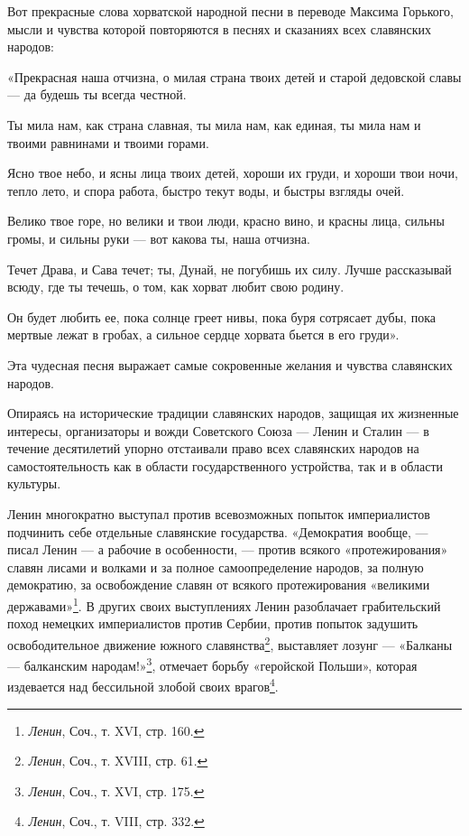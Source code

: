 \documentclass[12pt, a4paper, openany]{book}
\begin{document}
Вот прекрасные слова хорватской народной песни в переводе Максима Горького, мысли и чувства которой повторяются в песнях и сказаниях всех славянских народов:

«Прекрасная наша отчизна, о милая страна твоих детей и старой дедовской славы — да будешь ты всегда честной.

Ты мила нам, как страна славная, ты мила нам, как единая, ты мила нам и твоими равнинами и твоими горами.

Ясно твое небо, и ясны лица твоих детей, хороши их груди, и хороши твои ночи, тепло лето, и спора работа, быстро текут воды, и быстры взгляды очей.

Велико твое горе, но велики и твои люди, красно вино, и красны лица, сильны громы, и сильны руки — вот какова ты, наша отчизна.

Течет Драва, и Сава течет; ты, Дунай, не погубишь их силу. Лучше рассказывай всюду, где ты течешь, о том, как хорват любит свою родину.

Он будет любить ее, пока солнце греет нивы, пока буря сотрясает дубы, пока мертвые лежат в гробах, а сильное сердце хорвата бьется в его груди».

Эта чудесная песня выражает самые сокровенные желания и чувства славянских народов.

Опираясь на исторические традиции славянских народов, защищая их жизненные интересы, организаторы и вожди Советского Союза — Ленин и Сталин — в течение десятилетий упорно отстаивали право всех славянских народов на самостоятельность как в области государственного устройства, так и в области культуры.

Ленин многократно выступал против всевозможных попыток империалистов подчинить себе отдельные славянские государства. «Демократия вообще, — писал Ленин — а рабочие в особенности, — против всякого «протежирования» славян лисами и волками и за полное самоопределение народов, за полную демократию, за освобождение славян от всякого протежирования «великими державами»{\footnote{\textit{Ленин}, Соч., т. XVI, стр. 160.}}. В других своих выступлениях Ленин разоблачает грабительский поход немецких империалистов против Сербии, против попыток задушить освободительное движение южного славянства{\footnote{\textit{Ленин}, Соч., т. XVIII, стр. 61.}}, выставляет лозунг — «Балканы — балканским народам!»{\footnote{\textit{Ленин}, Соч., т. XVI, стр. 175.}}, отмечает борьбу «геройской Польши», которая издевается над бессильной злобой своих врагов{\footnote{\textit{Ленин}, Соч., т. VIII, стр. 332.}}.
\end{document}
